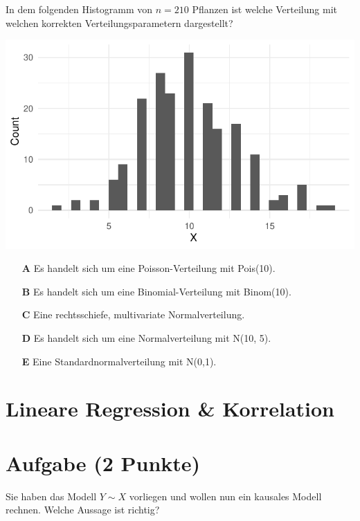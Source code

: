 \documentclass[a4paper, 9pt]{scrartcl}\usepackage[]{graphicx}\usepackage[]{xcolor}
\makeatletter
\def\maxwidth{ %
  \ifdim\Gin@nat@width>\linewidth
    \linewidth
  \else
    \Gin@nat@width
  \fi
}
\makeatother
\begin{document}
In dem folgenden Histogramm von $n = 210$ Pflanzen ist welche
Verteilung mit welchen korrekten Verteilungsparametern dargestellt?



{\centering \includegraphics[width=\maxwidth]{img/mc-distribution-02-a-1} 

}







\begin{enumerate}
\item [\textbf{A} \msquare] Es handelt sich um eine Poisson-Verteilung mit Pois(10).
\item [\textbf{B} \msquare] Es handelt sich um eine Binomial-Verteilung mit Binom(10).
\item [\textbf{C} \msquare] Eine rechtsschiefe, multivariate Normalverteilung.
\item [\textbf{D} \msquare] Es handelt sich um eine Normalverteilung mit N(10, 5).
\item [\textbf{E} \msquare] Eine Standardnormalverteilung mit N(0,1).
\end{enumerate} 
\section*{Lineare Regression \& Korrelation}

\section{Aufgabe \hfill (2 Punkte)}




Sie haben das Modell $Y \sim X$ vorliegen und wollen nun ein
kausales Modell rechnen. Welche Aussage ist richtig?
\end{document}

